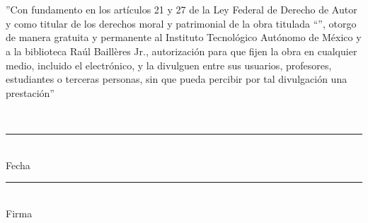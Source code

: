 \thispagestyle{empty}
\chapter*{\phantom{Declaración}}
''Con fundamento en los artículos 21 y 27 de la Ley Federal de Derecho de Autor y como titular de los derechos moral y patrimonial de la obra titulada ``\textbf{\thetitle}'', otorgo de manera gratuita y permanente al Instituto Tecnológico Autónomo de México y a la biblioteca Raúl Baillères Jr., autorización para que fijen la obra en cualquier medio, incluido el electrónico, y la divulguen entre sus usuarios, profesores, estudiantes o terceras personas, sin que pueda percibir por tal divulgación una prestación''
    \\
    \begin{center}
        \theauthor\\
        \vspace{4em}
        \rule[0mm]{60mm}{0.1mm}\\
        Fecha\\
        \vspace{3em}
        \rule[0mm]{60mm}{0.1mm}\\
        Firma\\
    \end{center}
\clearpage